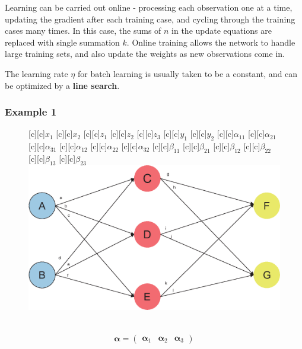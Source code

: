 \documentclass[12pt,a4paper]{article}%
\theoremstyle{definition}
\theoremstyle{plain}
\numberwithin{equation}{section}
\begin{document}
Learning can be carried out online - processing each observation one at a time, updating the gradient after each training case, and cycling through the training cases many times. 
In this case, the sums of $n$ in the update equations are replaced with single summation $k$. 
Online training allows the network to handle large training sets, and also update the weights as new observations come in.

The learning rate $\eta$ for batch learning is usually taken to be a constant, and can be optimized by a \textbf{line search}.

\subsubsection{Example 1}
\begin{figure}[H]
\centering
{}[c][c]{$x_{1}$}
[c][c]{$x_{2}$}
[c][c]{$z_{1}$}
[c][c]{$z_{2}$}
[c][c]{$z_{3}$}
[c][c]{$y_{1}$}
[c][c]{$y_{2}$}
[c][c]{\tiny $\alpha_{11}$}
[c][c]{\tiny $\alpha_{21}$}
[c][c]{\tiny $\alpha_{31}$}
[c][c]{\tiny $\alpha_{12}$}
[c][c]{\tiny $\alpha_{22}$}
[c][c]{\tiny $\alpha_{32}$}
[c][c]{\tiny $\beta_{11}$}
[c][c]{\tiny $\beta_{21}$}
[c][c]{\tiny $\beta_{12}$}
[c][c]{\tiny $\beta_{22}$}
[c][c]{\tiny $\beta_{13}$}
[c][c]{\tiny $\beta_{23}$}
\includegraphics[scale=0.6]{images//example-1.eps}
\\~\\
\end{figure}

\begin{gather}
\boldsymbol{\alpha} = \begin{pmatrix}
 \boldsymbol{\alpha}_{1} & \boldsymbol{\alpha}_{2}  & \boldsymbol{\alpha}_{3}
 \end{pmatrix}
\end{gather}
\end{document}
